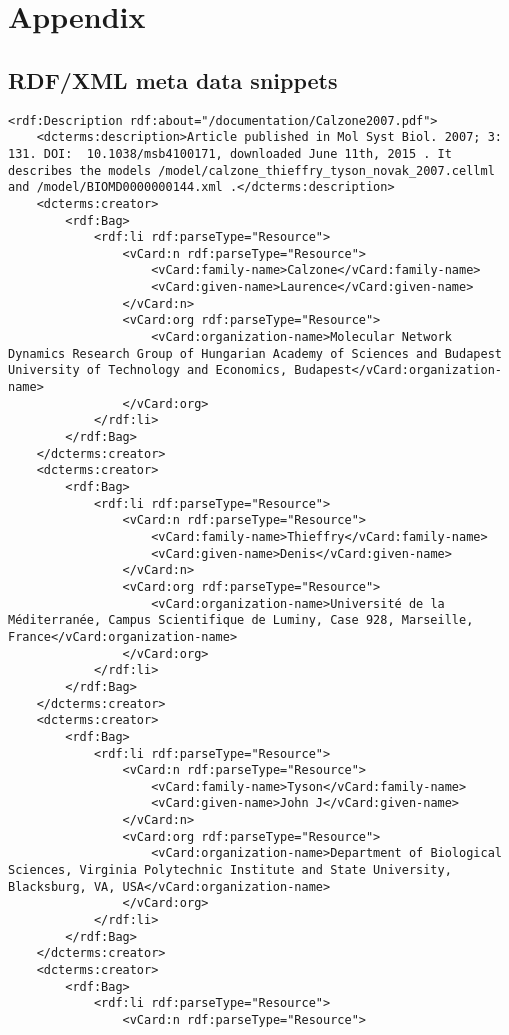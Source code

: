 \section{Appendix}
\label{sec:appendix}

\subsection{RDF/XML meta data snippets}
\label{sec:rdfmeta}
\begin{mdframed}[style=mddefault,frametitle={Meta Data of the Publication \tt{Calzone2007.pdf}}]
\begin{verbatim}
<rdf:Description rdf:about="/documentation/Calzone2007.pdf">
	<dcterms:description>Article published in Mol Syst Biol. 2007; 3: 131. DOI:  10.1038/msb4100171, downloaded June 11th, 2015 . It describes the models /model/calzone_thieffry_tyson_novak_2007.cellml and /model/BIOMD0000000144.xml .</dcterms:description>
	<dcterms:creator>
		<rdf:Bag>
			<rdf:li rdf:parseType="Resource">
				<vCard:n rdf:parseType="Resource">
					<vCard:family-name>Calzone</vCard:family-name>
					<vCard:given-name>Laurence</vCard:given-name>
				</vCard:n>
				<vCard:org rdf:parseType="Resource">
					<vCard:organization-name>Molecular Network Dynamics Research Group of Hungarian Academy of Sciences and Budapest University of Technology and Economics, Budapest</vCard:organization-name>
				</vCard:org>
			</rdf:li>
		</rdf:Bag>
	</dcterms:creator>
	<dcterms:creator>
		<rdf:Bag>
			<rdf:li rdf:parseType="Resource">
				<vCard:n rdf:parseType="Resource">
					<vCard:family-name>Thieffry</vCard:family-name>
					<vCard:given-name>Denis</vCard:given-name>
				</vCard:n>
				<vCard:org rdf:parseType="Resource">
					<vCard:organization-name>Université de la Méditerranée, Campus Scientifique de Luminy, Case 928, Marseille, France</vCard:organization-name>
				</vCard:org>
			</rdf:li>
		</rdf:Bag>
	</dcterms:creator>
	<dcterms:creator>
		<rdf:Bag>
			<rdf:li rdf:parseType="Resource">
				<vCard:n rdf:parseType="Resource">
					<vCard:family-name>Tyson</vCard:family-name>
					<vCard:given-name>John J</vCard:given-name>
				</vCard:n>
				<vCard:org rdf:parseType="Resource">
					<vCard:organization-name>Department of Biological Sciences, Virginia Polytechnic Institute and State University, Blacksburg, VA, USA</vCard:organization-name>
				</vCard:org>
			</rdf:li>
		</rdf:Bag>
	</dcterms:creator>
	<dcterms:creator>
		<rdf:Bag>
			<rdf:li rdf:parseType="Resource">
				<vCard:n rdf:parseType="Resource">

\end{verbatim}
\end{mdframed}
